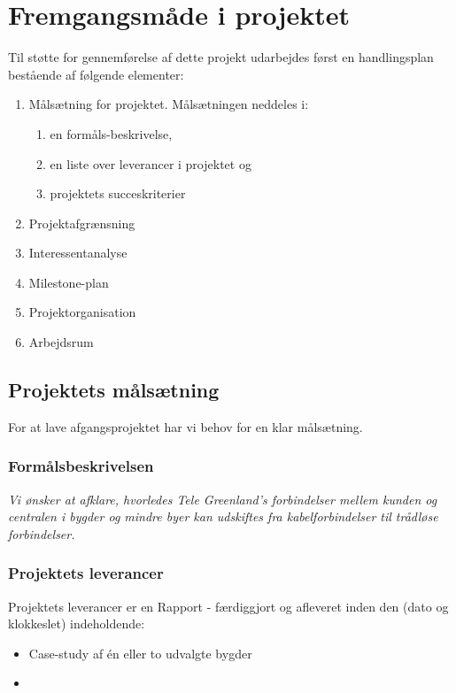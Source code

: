 \chapter{Fremgangsmåde i projektet}
Til støtte for gennemførelse af dette projekt udarbejdes først en handlingsplan bestående af følgende elementer:
\begin{enumerate}
 \item Målsætning for projektet. Målsætningen neddeles i:
  \begin{enumerate}
   \item en formåls-beskrivelse,
   \item en liste over leverancer i projektet og
   \item projektets succeskriterier
  \end{enumerate}
 \item Projektafgrænsning
 \item Interessentanalyse
 \item Milestone-plan
 \item Projektorganisation
 \item Arbejdsrum
\end{enumerate}

\section{Projektets målsætning}
For at lave afgangsprojektet har vi behov for en klar målsætning.

\subsection{Formålsbeskrivelsen}
\emph{Vi ønsker at afklare, hvorledes Tele Greenland's forbindelser mellem kunden og centralen i bygder og mindre byer kan udskiftes fra kabelforbindelser til trådløse forbindelser.}

\subsection{Projektets leverancer}
Projektets leverancer er en Rapport - færdiggjort og afleveret inden den (dato og klokkeslet) indeholdende:
\begin{itemize}
	\item Case-study af én eller to udvalgte bygder
	\item 
\end{itemize}                                                                                                         

